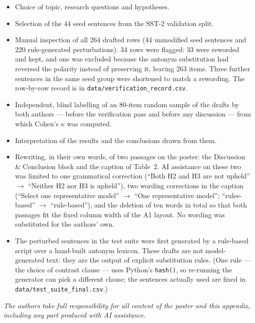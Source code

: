 \documentclass[11pt,a4paper]{article}
\begin{document}
\begin{itemize}
  \item Choice of topic, research questions and hypotheses.
  \item Selection of the 44 seed sentences from the SST-2 validation split.
  \item Manual inspection of all 264 drafted rows (44 unmodified seed sentences and
        220 rule-generated perturbations). 34 rows were flagged: 33 were reworded and
        kept, and one was excluded because the antonym substitution had reversed the
        polarity instead of preserving it, leaving 263 items. Three further sentences in
        the same seed group were shortened to match a rewording. The row-by-row record is
        in \texttt{data/verification\_record.csv}.
  \item Independent, blind labelling of an 80-item random sample of the drafts by both
        authors --- before the verification pass and before any discussion --- from which
        Cohen's $\kappa$ was computed.
  \item Interpretation of the results and the conclusions drawn from them.
  \item Rewriting, in their own words, of two passages on the poster: the Discussion \&
        Conclusion block and the caption of Table~2. AI assistance on these two was limited
        to one grammatical correction (``Both H2 and H3 are not upheld'' $\rightarrow$
        ``Neither H2 nor H3 is upheld''), two wording corrections in the caption
        (``Select one representative model'' $\rightarrow$ ``One representative model'';
        ``rules-based'' $\rightarrow$ ``rule-based''), and the deletion of ten words in total
        so that both passages fit the fixed column width of the A1 layout. No wording was
        substituted for the authors' own.
  \item The perturbed sentences in the test suite were first generated by a rule-based
        script over a hand-built antonym lexicon. These drafts are not model-generated
        text: they are the output of explicit substitution rules. (One rule --- the
        choice of contrast clause --- uses Python's \texttt{hash()}, so re-running the
        generator can pick a different clause; the sentences actually used are fixed in
        \texttt{data/test\_suite\_final.csv}.)
\end{itemize}

\vspace{0.4em}
\noindent
\textit{The authors take full responsibility for all content of the poster and this
appendix, including any part produced with AI assistance.}
\end{document}
